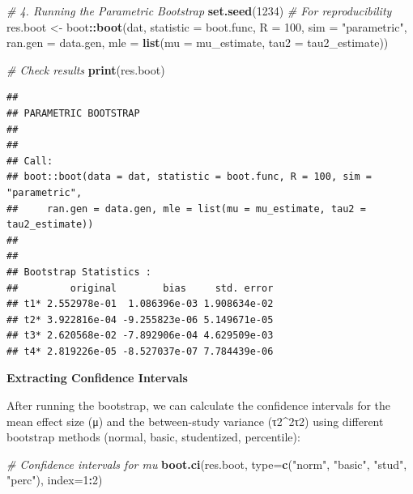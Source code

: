 \documentclass[
]{book}
\newenvironment{Shaded}{\begin{snugshade}}{\end{snugshade}}
\newcommand{\AttributeTok}[1]{\textcolor[rgb]{0.13,0.29,0.53}{#1}}
\newcommand{\CommentTok}[1]{\textcolor[rgb]{0.56,0.35,0.01}{\textit{#1}}}
\newcommand{\DecValTok}[1]{\textcolor[rgb]{0.00,0.00,0.81}{#1}}
\newcommand{\FunctionTok}[1]{\textcolor[rgb]{0.13,0.29,0.53}{\textbf{#1}}}
\newcommand{\NormalTok}[1]{#1}
\newcommand{\OtherTok}[1]{\textcolor[rgb]{0.56,0.35,0.01}{#1}}
\newcommand{\SpecialCharTok}[1]{\textcolor[rgb]{0.81,0.36,0.00}{\textbf{#1}}}
\newcommand{\StringTok}[1]{\textcolor[rgb]{0.31,0.60,0.02}{#1}}
\begin{document}
\begin{Shaded}
\begin{Highlighting}[]
\CommentTok{\# 4. Running the Parametric Bootstrap}
\FunctionTok{set.seed}\NormalTok{(}\DecValTok{1234}\NormalTok{)  }\CommentTok{\# For reproducibility}
\NormalTok{res.boot }\OtherTok{\textless{}{-}}\NormalTok{ boot}\SpecialCharTok{::}\FunctionTok{boot}\NormalTok{(dat, }
                        \AttributeTok{statistic =}\NormalTok{ boot.func, }
                        \AttributeTok{R =} \DecValTok{100}\NormalTok{, }
                        \AttributeTok{sim =} \StringTok{"parametric"}\NormalTok{, }
                        \AttributeTok{ran.gen =}\NormalTok{ data.gen, }
                        \AttributeTok{mle =} \FunctionTok{list}\NormalTok{(}\AttributeTok{mu =}\NormalTok{ mu\_estimate, }\AttributeTok{tau2 =}\NormalTok{ tau2\_estimate))}

\CommentTok{\# Check results}
\FunctionTok{print}\NormalTok{(res.boot)}
\end{Highlighting}
\end{Shaded}

\begin{verbatim}
## 
## PARAMETRIC BOOTSTRAP
## 
## 
## Call:
## boot::boot(data = dat, statistic = boot.func, R = 100, sim = "parametric", 
##     ran.gen = data.gen, mle = list(mu = mu_estimate, tau2 = tau2_estimate))
## 
## 
## Bootstrap Statistics :
##         original        bias     std. error
## t1* 2.552978e-01  1.086396e-03 1.908634e-02
## t2* 3.922816e-04 -9.255823e-06 5.149671e-05
## t3* 2.620568e-02 -7.892906e-04 4.629509e-03
## t4* 2.819226e-05 -8.527037e-07 7.784439e-06
\end{verbatim}

\textbf{Extracting Confidence Intervals}

After running the bootstrap, we can calculate the confidence intervals for the mean effect size (μ) and the between-study variance (τ2\tau\^{}2τ2) using different bootstrap methods (normal, basic, studentized, percentile):

\begin{Shaded}
\begin{Highlighting}[]
\CommentTok{\# Confidence intervals for mu}
\FunctionTok{boot.ci}\NormalTok{(res.boot, }\AttributeTok{type=}\FunctionTok{c}\NormalTok{(}\StringTok{"norm"}\NormalTok{, }\StringTok{"basic"}\NormalTok{, }\StringTok{"stud"}\NormalTok{, }\StringTok{"perc"}\NormalTok{), }\AttributeTok{index=}\DecValTok{1}\SpecialCharTok{:}\DecValTok{2}\NormalTok{)}
\end{Highlighting}
\end{Shaded}
\end{document}
